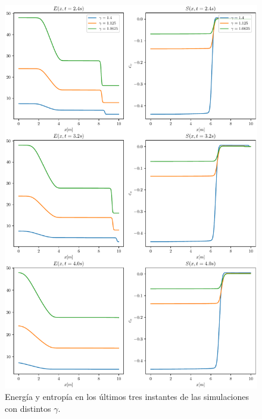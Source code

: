 \begin{figure}[H]
	\includegraphics[width=\linewidth]{../euler1D/experimentos/energia/2.pdf}
	\caption{Energía y entropía en los últimos tres instantes de las simulaciones con distintos $\gamma$.}
	\label{fig:ee-gammas-2}
\end{figure}